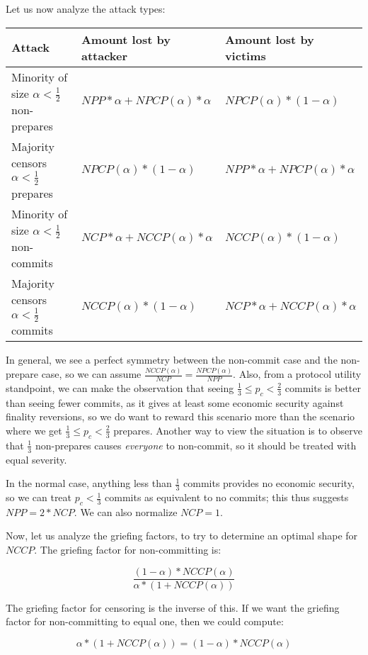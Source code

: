 \documentclass[12pt]{article}
\begin{document}
Let us now analyze the attack types:

\begin{tabularx}{\textwidth}{|X|X|X|}
\hline
Attack & Amount lost by attacker & Amount lost by victims \\
\hline
Minority of size $\alpha < \frac{1}{2}$ non-prepares & $NPP * \alpha + NPCP(\alpha) * \alpha$ & $NPCP(\alpha) * (1-\alpha)$ \\
Majority censors $\alpha < \frac{1}{2}$ prepares & $NPCP(\alpha) * (1-\alpha)$ & $NPP * \alpha + NPCP(\alpha) * \alpha$ \\
Minority of size $\alpha < \frac{1}{2}$ non-commits & $NCP * \alpha + NCCP(\alpha) * \alpha$ & $NCCP(\alpha) * (1-\alpha)$ \\
Majority censors $\alpha < \frac{1}{2}$ commits & $NCCP(\alpha) * (1-\alpha)$ & $NCP * \alpha + NCCP(\alpha) * \alpha$ \\
\hline
\end{tabularx}

In general, we see a perfect symmetry between the non-commit case and the non-prepare case, so we can assume $\frac{NCCP(\alpha)}{NCP} = \frac{NPCP(\alpha)}{NPP}$. Also, from a protocol utility standpoint, we can make the observation that seeing $\frac{1}{3} \le p_c < \frac{2}{3}$ commits is better than seeing fewer commits, as it gives at least some economic security against finality reversions, so we do want to reward this scenario more than the scenario where we get $\frac{1}{3} \le p_c < \frac{2}{3}$ prepares. Another way to view the situation is to observe that $\frac{1}{3}$ non-prepares causes \textit{everyone} to non-commit, so it should be treated with equal severity.

In the normal case, anything less than $\frac{1}{3}$ commits provides no economic security, so we can treat $p_c < \frac{1}{3}$ commits as equivalent to no commits; this thus suggests $NPP = 2 * NCP$. We can also normalize $NCP = 1$.

Now, let us analyze the griefing factors, to try to determine an optimal shape for $NCCP$. The griefing factor for non-committing is:

$$\frac{(1-\alpha) * NCCP(\alpha)}{\alpha * (1 + NCCP(\alpha))}$$

The griefing factor for censoring is the inverse of this. If we want the griefing factor for non-committing to equal one, then we could compute:

$$\alpha * (1 + NCCP(\alpha)) = (1-\alpha) * NCCP(\alpha)$$
\end{document}
